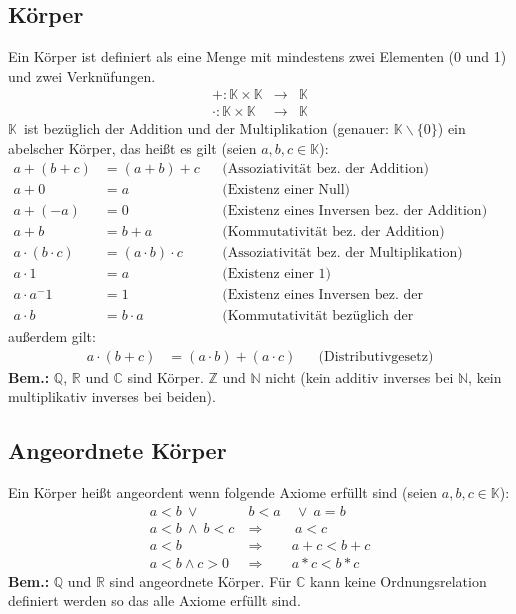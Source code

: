 \documentclass[10pt]{article}
\newcommand{\K}{$\mathbb{K}$}
\newcommand{\N}{\mathbb{N}}
\newcommand{\Z}{\mathbb{Z}}
\newcommand{\Q}{\mathbb{Q}}
\newcommand{\R}{\mathbb{R}}
\newcommand{\C}{\mathbb{C}}
\begin{document}
    \subsection{Körper}
    Ein Körper ist definiert als eine Menge mit mindestens zwei Elementen
    (0 und 1) und zwei Verknüfungen.
    \begin{eqnarray*}
        +: \mathbb{K} \times \mathbb{K} &\rightarrow& \mathbb{K}\\
        \cdot: \mathbb{K} \times \mathbb{K} &\rightarrow& \mathbb{K}
    \end{eqnarray*}
    \K\ ist bezüglich der Addition und der Multiplikation (genauer: $\mathbb{K} \backslash \{0\}$) ein abelscher
    Körper, das heißt es gilt (seien $a,b,c \in \mathbb{K}$):
    \begin{align*}
        a + (b + c) &= (a + b) + c &&\text{(Assoziativität bez.\ der Addition)}\\
        a + 0 &= a &&\text{(Existenz einer Null)}\\
        a + (-a) &= 0 &&\text{(Existenz eines Inversen bez.\ der Addition)}\\
        a + b &= b + a &&\text{(Kommutativität bez.\ der Addition)}\\
        a \cdot (b \cdot c) &= (a \cdot b) \cdot c &&\text{(Assoziativität bez.\ der Multiplikation)}\\
        a \cdot 1 &= a &&\text{(Existenz einer 1)}\\
        a \cdot a^-1 &= 1 &&\text{(Existenz eines Inversen bez.\ der Multiplikation)}\\
        a \cdot b &= b \cdot a &&\text{(Kommutativität bezüglich der Multiplikation)}
    \end{align*}
    außerdem gilt:
    \begin{align*}
        a \cdot (b + c) &= (a \cdot b) + (a \cdot c) &&\text{(Distributivgesetz)}
    \end{align*}
    \textbf{Bem.:}
    $\Q$, $\R$ und $\C$ sind Körper.
    $\Z$ und $\N$ nicht (kein additiv inverses bei $\N$,
    kein multiplikativ inverses bei beiden).


    \subsection{Angeordnete Körper}
    Ein Körper heißt angeordent wenn folgende Axiome erfüllt sind
    (seien $a,b,c \in \mathbb{K}$):
    \begin{eqnarray*}
        a<b\ \vee\ &b<a&\ \vee\ a=b\\
        a<b\ \wedge\ b<c\ &\Rightarrow&\ a<c\\
        a<b &\Rightarrow& a+c<b+c\\
        a<b \wedge c>0 &\Rightarrow& a*c<b*c
    \end{eqnarray*}
    \textbf{Bem.:}
    $\Q$ und $\R$ sind angeordnete Körper. Für $\C$
    kann keine Ordnungsrelation definiert werden so das alle Axiome erfüllt
    sind.
\end{document}
